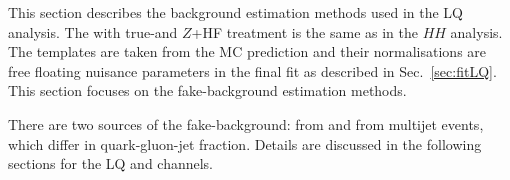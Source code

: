 This section describes the background estimation methods used in the LQ analysis. The
\ttbar with true-\tauhad and $Z$+HF treatment is the same as in the $HH$ analysis.
The templates are taken from the MC prediction and their normalisations are free floating 
nuisance parameters in the final fit as described in Sec.~\ref{sec:fitLQ}.
This section focuses on the fake-\tauhad background estimation methods.

There are two sources of the fake-\tauhad background: from \ttbar and from multijet events, 
which differ in quark-gluon-jet fraction. Details are discussed in the following sections for 
the LQ \lephad and \hadhad channels.


\label{subsec:LQLepHadttbarfake}



\label{subsec:LQLepHadmultijet}


\label{subsec:LQHadHadmultijet}

\newpage
